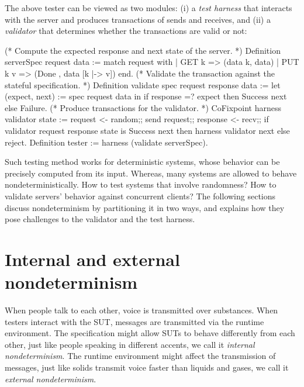 The above tester can be viewed as two modules: (i) a {\em test harness} that
interacts with the server and produces transactions of sends and receives, and
(ii) a {\em validator} that determines whether the transactions are valid or
not:
\begin{coq}
  (* Compute the expected response and next state of the server. *)
  Definition serverSpec request data :=
    match request with
    | GET k   => (data k, data)
    | PUT k v => (Done  , data [k |-> v])
    end.
  (* Validate the transaction against the stateful specification. *)
  Definition validate spec request response data :=
    let (expect, next) := spec request data in
    if response =? expect then Success next else Failure.
  (* Produce transactions for the validator. *)
  CoFixpoint harness validator state :=
    request <- random;;
    send request;;
    response <- recv;;
    if validator request response state is Success next
    then harness validator next
    else reject.
  Definition tester := harness (validate serverSpec).
\end{coq}
Such testing method works for deterministic systems, whose behavior can be
precisely computed from its input.  Whereas, many systems are allowed to behave
nondeterministically.  How to test systems that involve randomness?  How to
validate servers' behavior against concurrent clients?  The following sections
discuss nondeterminism by partitioning it in two ways, and explains how they
pose challenges to the validator and the test harness.

\section{Internal and external nondeterminism}
\label{sec:internal-external-nondeterminism}
When people talk to each other, voice is transmitted over substances.  When
testers interact with the SUT, messages are transmitted via the runtime
environment.  The specification might allow SUTs to behave differently from each
other, just like people speaking in different accents, we call it {\em internal
  nondeterminism}.  The runtime environment might affect the transmission of
messages, just like solids transmit voice faster than liquids and gases, we call
it {\em external nondeterminism}.

